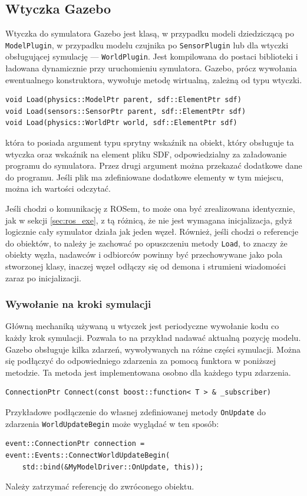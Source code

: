 	\subsection{Wtyczka Gazebo}
		\label{sec:gazebo_bib}
		Wtyczka do symulatora Gazebo jest klasą, w przypadku modeli dziedziczącą po \texttt{ModelPlugin},
		w przypadku modelu czujnika po \texttt{SensorPlugin} lub dla wtyczki obsługującej symulację --- \texttt{WorldPlugin}.
		Jest kompilowana do postaci biblioteki i ładowana dynamicznie przy uruchomieniu symulatora.
		Gazebo, prócz wywołania ewentualnego konstruktora, wywołuje metodę wirtualną, zależną od typu wtyczki.
		\begin{verbatim}
void Load(physics::ModelPtr parent, sdf::ElementPtr sdf)
void Load(sensors::SensorPtr parent, sdf::ElementPtr sdf)
void Load(physics::WorldPtr world, sdf::ElementPtr sdf)
		\end{verbatim}
		która to posiada argument typu sprytny wskaźnik na obiekt, który obsługuje ta wtyczka oraz wskaźnik na element pliku SDF, odpowiedzialny za załadowanie programu do symulatora.
		Przez drugi argument można przekazać dodatkowe dane do programu. Jeśli plik ma zdefiniowane dodatkowe elementy w tym miejscu, można ich wartości odczytać.
		
		Jeśli chodzi o komunikację z ROSem, to może ona być zrealizowana identycznie, jak w sekcji \ref{sec:ros_exe}, 
		z tą różnicą, że nie jest wymagana inicjalizacja, gdyż logicznie cały symulator działa jak jeden węzeł.
		Również, jeśli chodzi o referencje do obiektów, to należy je zachować po opuszczeniu metody \texttt{Load}, to znaczy
		że obiekty węzła, nadawców i odbiorców powinny być przechowywane jako pola stworzonej klasy, inaczej węzeł odłączy się od demona i strumieni wiadomości zaraz po inicjalizacji.

		\subsubsection{Wywołanie na kroki symulacji}
			Główną mechaniką używaną u wtyczek jest periodyczne wywołanie kodu co każdy krok symulacji.
			Pozwala to na przykład nadawać aktualną pozycję modelu.
			Gazebo obsługuje kilka zdarzeń, wywoływanych na różne części symulacji.
			Można się podłączyć do odpowiedniego zdarzenia za pomocą funktora w poniższej metodzie.
			Ta metoda jest implementowana osobno dla każdego typu zdarzenia.
			\begin{verbatim}
ConnectionPtr Connect(const boost::function< T > & _subscriber)	
			\end{verbatim}
			Przykładowe podłączenie do własnej zdefiniowanej metody \texttt{OnUpdate} do zdarzenia \texttt{WorldUpdateBegin} może wyglądać w ten sposób:
			\begin{verbatim}
event::ConnectionPtr connection = event::Events::ConnectWorldUpdateBegin(
	std::bind(&MyModelDriver::OnUpdate, this));
			\end{verbatim}
			Należy zatrzymać referencję do zwróconego obiektu.
			
